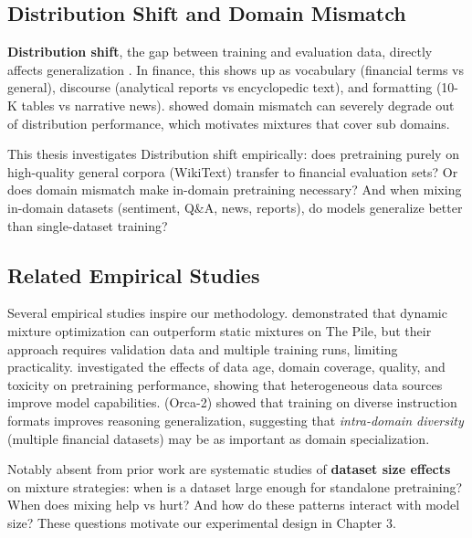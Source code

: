 \subsection{Distribution Shift and Domain Mismatch}

\textbf{Distribution shift}, the gap between training and evaluation data, directly affects generalization \parencite{quinonero2009dataset}. In finance, this shows up as vocabulary (financial terms vs general), discourse (analytical reports vs encyclopedic text), and formatting (10-K tables vs narrative news). \textcite{aharoni2020unsupervised} showed domain mismatch can severely degrade out of distribution performance, which motivates mixtures that cover sub domains.

This thesis investigates Distribution shift empirically: does pretraining purely on high-quality general corpora (WikiText) transfer to financial evaluation sets? Or does domain mismatch make in-domain pretraining necessary? And when mixing in-domain datasets (sentiment, Q\&A, news, reports), do models generalize better than single-dataset training?

\subsection{Related Empirical Studies}

Several empirical studies inspire our methodology. \textcite{xie2023doremi} demonstrated that dynamic mixture optimization can outperform static mixtures on The Pile, but their approach requires validation data and multiple training runs, limiting practicality. \textcite{longpre2023pretrainer} investigated the effects of data age, domain coverage, quality, and toxicity on pretraining performance, showing that heterogeneous data sources improve model capabilities. \textcite{mitra2023orca} (Orca-2) showed that training on diverse instruction formats improves reasoning generalization, suggesting that \textit{intra-domain diversity} (multiple financial datasets) may be as important as domain specialization.

Notably absent from prior work are systematic studies of \textbf{dataset size effects} on mixture strategies: when is a dataset large enough for standalone pretraining? When does mixing help vs hurt? And how do these patterns interact with model size? These questions motivate our experimental design in Chapter 3.
